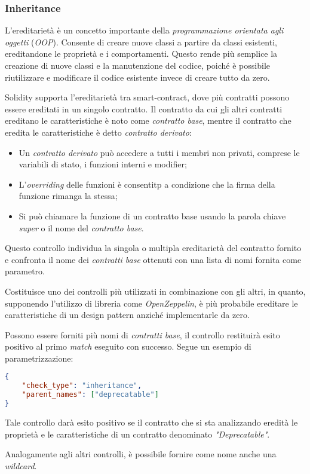 \subsubsection{Inheritance}
L'ereditarietà è un concetto importante della \textit{programmazione orientata agli oggetti} (\textit{OOP}). Consente di creare nuove classi a partire da classi esistenti, ereditandone le proprietà e i comportamenti. Questo rende più semplice la creazione di nuove classi e la manutenzione del codice, poiché è possibile riutilizzare e modificare il codice esistente invece di creare tutto da zero.\par
Solidity supporta l'ereditarietà tra smart-contract, dove più contratti possono essere ereditati in un singolo contratto. Il contratto da cui gli altri contratti ereditano le caratteristiche è noto come \textit{contratto base}, mentre il contratto che eredita le caratteristiche è detto \textit{contratto derivato}:
\begin{itemize}
	\item Un \textit{contratto derivato} può accedere a tutti i membri non privati, comprese le variabili di stato, i funzioni interni e modifier;
	\item L'\textit{overriding} delle funzioni è consentitp a condizione che la firma della funzione rimanga la stessa;
	\item Si può chiamare la funzione di un contratto base usando la parola chiave \textit{super} o il nome del \textit{contratto base}.
\end{itemize}
Questo controllo individua la singola o multipla ereditarietà del contratto fornito e confronta il nome dei \textit{contratti base} ottenuti con una lista di nomi fornita come parametro.\par
Costituisce uno dei controlli più utilizzati in combinazione con gli altri, in quanto, supponendo l'utilizzo di libreria come \textit{OpenZeppelin}\cite{openzeppelin}, è più probabile ereditare le caratteristiche di un design pattern anziché implementarle da zero.\par
Possono essere forniti più nomi di \textit{contratti base}, il controllo restituirà esito positivo al primo \textit{match} eseguito con successo.
Segue un esempio di parametrizzazione:
{\begin{lstlisting}[language=json, caption={Parametrizzazione del controllo Inheritance}]
{
	"check_type": "inheritance",
	"parent_names": ["deprecatable"]
}\end{lstlisting}}
\noindent Tale controllo darà esito positivo se il contratto che si sta analizzando eredità le proprietà e le caratteristiche di un contratto denominato \textit{"Deprecatable"}.\par
Analogamente agli altri controlli, è possibile fornire come nome anche una \textit{wildcard}.

